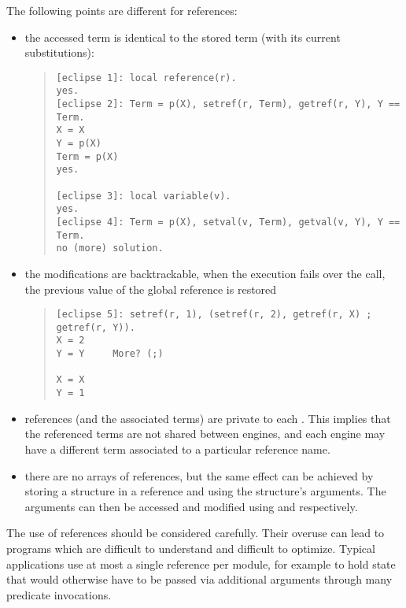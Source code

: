 The following points are different for references:
\begin{itemize}
\item the accessed term is identical to the stored term (with its current
substitutions):
\begin{quote}
\begin{verbatim}
[eclipse 1]: local reference(r).
yes.
[eclipse 2]: Term = p(X), setref(r, Term), getref(r, Y), Y == Term.
X = X
Y = p(X)
Term = p(X)
yes.

[eclipse 3]: local variable(v).
yes.
[eclipse 4]: Term = p(X), setval(v, Term), getval(v, Y), Y == Term.
no (more) solution.
\end{verbatim}
\end{quote}

\item the modifications are backtrackable, when the execution fails
over the  call, the
previous value of the global reference is restored

\begin{quote}
\begin{verbatim}
[eclipse 5]: setref(r, 1), (setref(r, 2), getref(r, X) ; getref(r, Y)).
X = 2
Y = Y     More? (;)

X = X
Y = 1
\end{verbatim}
\end{quote}

\item references (and the associated terms) are private to each
.  This implies that
the referenced terms are not shared between engines, and each engine
may have a different term associated to a particular reference name.

\item there are no arrays of references, but the same effect can be
achieved by storing a structure in a reference and using the structure's
arguments. The arguments can then be accessed and modified using
 and
 respectively.
\end{itemize}

The use of references should be considered carefully.
Their overuse can lead to programs which are
difficult to understand and difficult to optimize.
Typical applications use at most a single reference per module,
for example to hold state that would otherwise have to be passed
via additional arguments through many predicate invocations.

